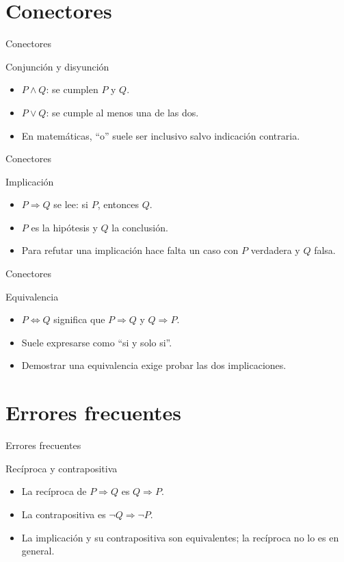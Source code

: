 \documentclass[aspectratio=169,11pt]{beamer}
\begin{document}
\section{Conectores}

\begin{frame}{Conectores}
\begin{block}{Conjunción y disyunción}
\begin{itemize}
  \item \(P\wedge Q\): se cumplen \(P\) y \(Q\).
  \item \(P\vee Q\): se cumple al menos una de las dos.
  \item En matemáticas, ``o'' suele ser inclusivo salvo indicación contraria.
\end{itemize}
\end{block}
\end{frame}

\begin{frame}{Conectores}
\begin{block}{Implicación}
\begin{itemize}
  \item \(P\Rightarrow Q\) se lee: si \(P\), entonces \(Q\).
  \item \(P\) es la hipótesis y \(Q\) la conclusión.
  \item Para refutar una implicación hace falta un caso con \(P\) verdadera y \(Q\) falsa.
\end{itemize}
\end{block}
\end{frame}

\begin{frame}{Conectores}
\begin{block}{Equivalencia}
\begin{itemize}
  \item \(P\Leftrightarrow Q\) significa que \(P\Rightarrow Q\) y \(Q\Rightarrow P\).
  \item Suele expresarse como ``si y solo si''.
  \item Demostrar una equivalencia exige probar las dos implicaciones.
\end{itemize}
\end{block}
\end{frame}

\section{Errores frecuentes}

\begin{frame}{Errores frecuentes}
\begin{block}{Recíproca y contrapositiva}
\begin{itemize}
  \item La recíproca de \(P\Rightarrow Q\) es \(Q\Rightarrow P\).
  \item La contrapositiva es \(\neg Q\Rightarrow \neg P\).
  \item La implicación y su contrapositiva son equivalentes; la recíproca no lo es en general.
\end{itemize}
\end{block}
\end{frame}
\end{document}
